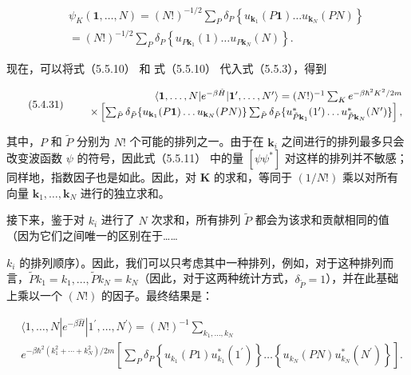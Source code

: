 \begin{equation}\tag{5.4.30}\label{eq:5.4.30}
\begin{array}{rlr} & { } & { \psi _ { K } ( \mathbf { 1 } , \ldots , N ) = ( N ! ) ^{- 1 / 2} \sum _ { P } \delta _ { P } \left\{ u _ { \mathbf { k } _ { 1 } } ( P \mathbf { 1 } ) \ldots u _ { \mathbf { k } _ { N } } ( P N ) \right\} } \\& { } & { = ( N ! ) ^{- 1 / 2} \sum _ { P } \delta _ { P } \left\{ u _ { P \mathbf { k } _ { 1 } } ( 1 ) \ldots u _ { P \mathbf { k } _ { N } } ( N ) \right\} . } \end{array}
\end{equation}

现在，可以将式（5.5.10） 和 式（5.5.10） 代入式（5.5.3），得到

\begin{equation}\tag{5.4.31}\label{eq:5.4.31}
\begin{array}{rlr} & { } & { \langle { \bf 1 } , \ldots , N | e ^{- \beta \hat { H} } | { \bf 1 } ^{\prime} , \ldots , N ^{\prime} \rangle = ( N ! ) ^{- 1} \sum _ { K } e ^{- \beta \hbar ^ { 2} K ^{2} / 2 m } } \\& { } & { \times \left[ \sum _ { \tilde { P } } \delta _ { \tilde { P } } \{ u _ { { \bf k } _ { 1 } } ( P { \bf 1 } ) \ldots u _ { { \bf k } _ { N } } ( P N ) \} \sum _ { \tilde { P } } \delta _ { \tilde { P } } \{ u _ { \tilde { P } { \bf k } _ { 1 } } ^{*} ( 1 ^{\prime} ) \ldots u _ { \tilde { P } { \bf k } _ { N } } ^{*} ( N ^{\prime} ) \} \right] , } \end{array}
\end{equation}

其中，\(P\) 和 \(\tilde{P}\) 分别为 \(N!\) 个可能的排列之一。由于在 \(\boldsymbol{k}_i\) 之间进行的排列最多只会改变波函数 \(\psi\) 的符号，因此式（5.5.11） 中的量 \([\psi\psi^*]\) 对这样的排列并不敏感；同样地，指数因子也是如此。因此，对 \(\boldsymbol{K}\) 的求和，等同于 \((1/N!)\) 乘以对所有向量 \(\boldsymbol{k}_1,\ldots,\boldsymbol{k}_N\) 进行的独立求和。

接下来，鉴于对 \(k_i\) 进行了 \(N\) 次求和，所有排列 \(\tilde{P}\) 都会为该求和贡献相同的值（因为它们之间唯一的区别在于\ldots\ldots{}

\(k_i\) 的排列顺序）。因此，我们可以只考虑其中一种排列，例如，对于这种排列而言，\(\tilde{P}k_1 = k_1, \ldots, \tilde{P}k_N = k_N\)（因此，对于这两种统计方式，\(\delta_{\tilde{P}} = 1\)），并在此基础上乘以一个 \((N!)\) 的因子。最终结果是：

\begin{equation}\tag{5.4.32}\label{eq:5.4.32}
\begin{array}{rl} & { \langle 1 , \ldots , N | e ^{- \beta \hat { H} } | 1 ^{\prime} , \ldots , N ^{\prime} \rangle = ( N ! ) ^{- 1} \sum _ { k _ { 1 } , \ldots , k _ { N } } } \\& {  e ^{- \beta \hbar ^ { 2} ( k _ { 1 } ^{2} + \cdots + k _ { N } ^{2} ) / 2 m } \left[ \sum _ { P } \delta _ { P } \left\{ u _ { k _ { 1 } } ( P 1 ) u _ { k _ { 1 } } ^{*} ( 1 ^{\prime} ) \right\} \ldots \left\{ u _ { k _ { N } } ( P N ) u _ { k _ { N } } ^{*} ( N ^{\prime} ) \right\} \right] . } \end{array}
\end{equation}

